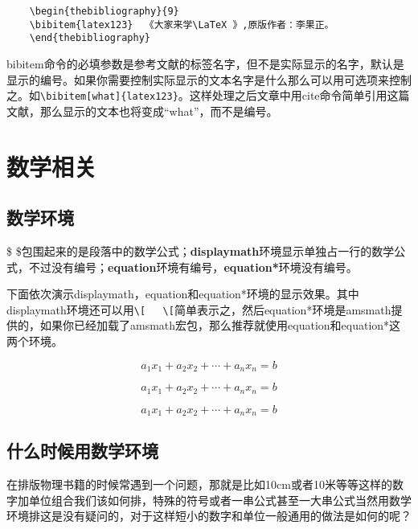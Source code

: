 \documentclass[11pt,oneside]{book}
\begin{document}
  \begin{Verbatim}
    \begin{thebibliography}{9}
    \bibitem{latex123}  《大家来学\LaTeX 》,原版作者：李果正。
    \end{thebibliography}
  \end{Verbatim}

  bibitem命令的必填参数是参考文献的标签名字，但不是实际显示的名字，默认是显示的编号。如果你需要控制实际显示的文本名字是什么那么可以用可选项来控制之。如\verb+\bibitem[what]{latex123}+。这样处理之后文章中用cite命令简单引用这篇文献，那么显示的文本也将变成“what”，而不是编号。

  \chapter{数学相关}

  \section{数学环境}
  \$ \$包围起来的是段落中的数学公式；\textbf{displaymath}环境显示单独占一行的数学公式，不过没有编号；\textbf{equation}环境有编号，\textbf{equation*}环境没有编号。

  下面依次演示displaymath，equation和equation*环境的显示效果。其中displaymath环境还可以用\verb+\[   \[+简单表示之，然后equation*环境是amsmath提供的，如果你已经加载了amsmath宏包，那么推荐就使用equation和equation*这两个环境。

      \begin{displaymath}
        a_1x_1 + a_2x_2 + \cdots + a_nx_n = b
      \end{displaymath}

      \begin{equation}
        a_1x_1 + a_2x_2 + \cdots + a_nx_n = b
      \end{equation}


      \begin{equation*}
        a_1x_1 + a_2x_2 + \cdots + a_nx_n = b
      \end{equation*}



      \section{什么时候用数学环境}
      在排版物理书籍的时候常遇到一个问题，那就是比如10cm或者10米等等这样的数字加单位组合我们该如何排，特殊的符号或者一串公式甚至一大串公式当然用数学环境排这是没有疑问的，对于这样短小的数字和单位一般通用的做法是如何的呢？
\end{document}
